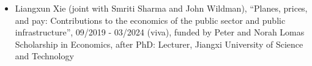 \documentclass[10pt,pdftex,a4paper,oneside]{article}
\begin{document}
\begin{itemize}[noitemsep,nolistsep]
\item Liangxun Xie (joint with Smriti Sharma and John Wildman), ``Planes, prices, and pay: Contributions to the economics of the public sector and public infrastructure'', 09/2019 - 03/2024 (viva), funded by Peter and Norah Lomas Scholarship in Economics, after PhD: Lecturer, Jiangxi University of Science and Technology


\end{itemize}

\end{document}
